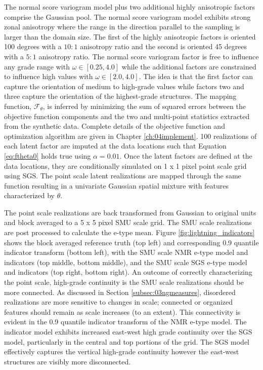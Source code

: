 The normal score variogram model plus two additional highly anisotropic factors comprise the Gaussian pool. The normal score variogram model exhibits strong zonal anisotropy where the range in the direction parallel to the sampling is larger than the domain size. The first of the highly anisotropic factors is oriented 100 degrees with a $10:1$ anisotropy ratio and the second is oriented 45 degrees with a  $5:1$ anisotropy ratio. The normal score variogram factor is free to influence any grade range with $\omega \in [0.25, 4.0]$ while the additional factors are constrained to influence high values with $\omega \in [2.0, 4.0]$. The idea is that the first factor can capture the orientation of medium to high-grade values while factors two and three capture the orientation of the highest-grade structures. The mapping function, $\mathcal{F}_{\theta}$, is inferred by minimizing the sum of squared errors between the objective function components and the two and multi-point statistics extracted from the synthetic data. Complete details of the objective function and optimization algorithm are given in Chapter \ref{ch:04implement}. 100 realizations of each latent factor are imputed at the data locations such that Equation \ref{eq:ftheta0} holds true using $\alpha = 0.01$. Once the latent factors are defined at the data locations, they are conditionally simulated on 1 x 1 pixel point scale grid using \gls{SGS}. The point scale latent realizations are mapped through the same function resulting in a univariate Gaussian spatial mixture with features characterized by $\theta$.

The point scale realizations are back transformed from Gaussian to original units and block averaged to a 5 x 5 pixel \gls{SMU} scale grid. The \gls{SMU} scale realizations are post processed to calculate the e-type mean. Figure \ref{fig:lightning_indicators} shows the block averaged reference truth (top left) and corresponding 0.9 quantile indicator transform (bottom left), with the \gls{SMU} scale \gls{NMR} e-type model and indicators (top middle, bottom middle), and the \gls{SMU} scale \gls{SGS} e-type model and indicators (top right, bottom right). An outcome of correctly characterizing the point scale, high-grade continuity is the \gls{SMU} scale realizations should be more connected. As discussed in Section \ref{subsec:03ngmeasures}, disordered realizations are more sensitive to changes in scale; connected or organized features should remain as scale increases (to an extent). This connectivity is evident in the 0.9 quantile indicator transform of the \gls{NMR} e-type model. The indicator model exhibits increased east-west high grade continuity over the \gls{SGS} model, particularly in the central and top portions of the grid. The \gls{SGS} model effectively captures the vertical high-grade continuity however the east-west structures are visibly more disconnected.

